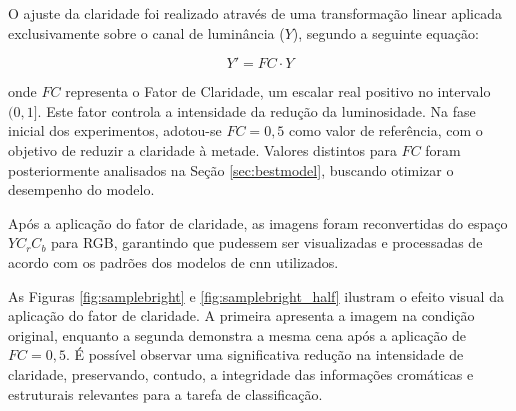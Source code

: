 O ajuste da claridade foi realizado através de uma transformação linear aplicada exclusivamente sobre o canal de luminância ($Y$), segundo a seguinte equação:

\begin{equation}
    \label{eqn:fb}
    Y' = FC \cdot Y
\end{equation}

onde $FC$ representa o Fator de Claridade, um escalar real positivo no intervalo $(0, 1]$. Este fator controla a intensidade da redução da luminosidade. Na fase inicial dos experimentos, adotou-se $FC = 0,5$ como valor de referência, com o objetivo de reduzir a claridade à metade. Valores distintos para $FC$ foram posteriormente analisados na Seção \ref{sec:bestmodel}, buscando otimizar o desempenho do modelo.

Após a aplicação do fator de claridade, as imagens foram reconvertidas do espaço $YC_rC_b$ para RGB, garantindo que pudessem ser visualizadas e processadas de acordo com os padrões dos modelos de \acrshort{cnn} utilizados.

As Figuras \ref{fig:samplebright} e \ref{fig:samplebright_half} ilustram o efeito visual da aplicação do fator de claridade. A primeira apresenta a imagem na condição original, enquanto a segunda demonstra a mesma cena após a aplicação de $FC = 0,5$. É possível observar uma significativa redução na intensidade de claridade, preservando, contudo, a integridade das informações cromáticas e estruturais relevantes para a tarefa de classificação.

